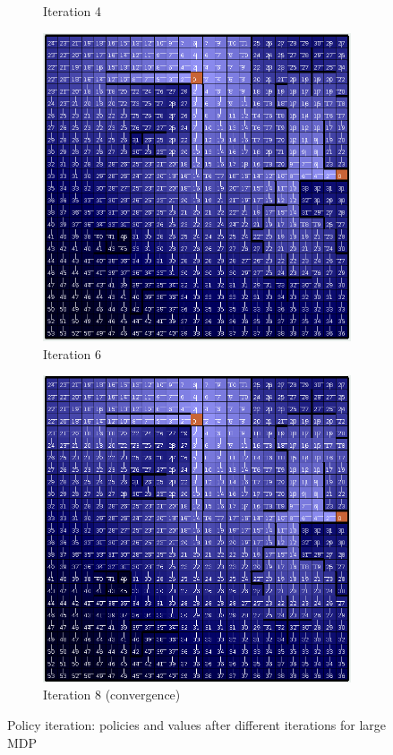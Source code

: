 \documentclass[letterpaper]{article}
\begin{document}
\begin{figure}
\begin{subfigure}[t]{.23\textwidth}
			\caption{Iteration 4}
		\end{subfigure}
		\begin{subfigure}[t]{.23\textwidth}
			\centering
			\includegraphics[width=\linewidth]{images/big_pi_6}
			\caption{Iteration 6}
		\end{subfigure}
		\begin{subfigure}[t]{.23\textwidth}
			\centering
			\includegraphics[width=\linewidth]{images/big_pi}
			\caption{Iteration 8 (convergence)}
		\end{subfigure}
		\caption{Policy iteration: policies and values after different iterations for large MDP}
		\label{fig:mdp-pi-iter-large}%
	\end{figure}%
	
\end{document}
